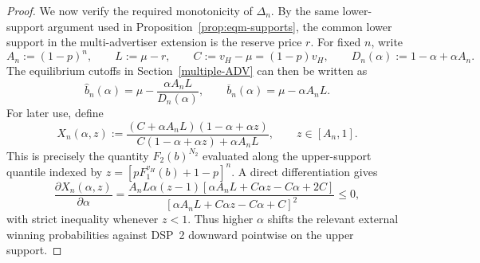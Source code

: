 \documentclass[11pt]{article}
\theoremstyle{plain}
\theoremstyle{definition}
\theoremstyle{plain}
\theoremstyle{plain}
\theoremstyle{plain}
\theoremstyle{plain}
\numberwithin{equation}{section}
\begin{document}
\begin{proof}
\noindent We now verify the required monotonicity of $\Delta_n$. By the same lower-support argument used in Proposition~\ref{prop:eqm-supports}, the common lower support in the multi-advertiser extension is the reserve price $r$. For fixed $n$, write
\begin{equation*}
    A_n := (1-p)^n, \qquad L := \mu-r, \qquad C := v_H-\mu = (1-p)v_H, \qquad D_n(\alpha) := 1-\alpha+\alpha A_n.
\end{equation*}
The equilibrium cutoffs in Section~\ref{multiple-ADV} can then be written as
\begin{equation*}
    \hat{b}_n(\alpha) = \mu - \frac{\alpha A_n L}{D_n(\alpha)}, \qquad \overline{b}_n(\alpha) = \mu - \alpha A_n L.
\end{equation*}
For later use, define
\begin{equation*}
    X_n(\alpha,z) := \frac{(C+\alpha A_n L)(1-\alpha+\alpha z)}{C(1-\alpha+\alpha z)+\alpha A_n L}, \qquad z \in [A_n,1].
\end{equation*}
This is precisely the quantity $F_2(b)^{N_2}$ evaluated along the upper-support quantile indexed by $z = [pF_1^{v_H}(b)+1-p]^n$. A direct differentiation gives
\begin{equation}\label{eq:Xn-alpha}
    \frac{\partial X_n(\alpha,z)}{\partial \alpha}
    =
    \frac{A_nL\alpha(z-1)\left[\alpha A_nL + C\alpha z - C\alpha + 2C\right]}{\left[\alpha A_nL + C\alpha z - C\alpha + C\right]^2}
    \leq 0,
\end{equation}
with strict inequality whenever $z<1$. Thus higher $\alpha$ shifts the relevant external winning probabilities against DSP~2 downward pointwise on the upper support.

\vspace{2mm}


\end{proof}
\end{document}
